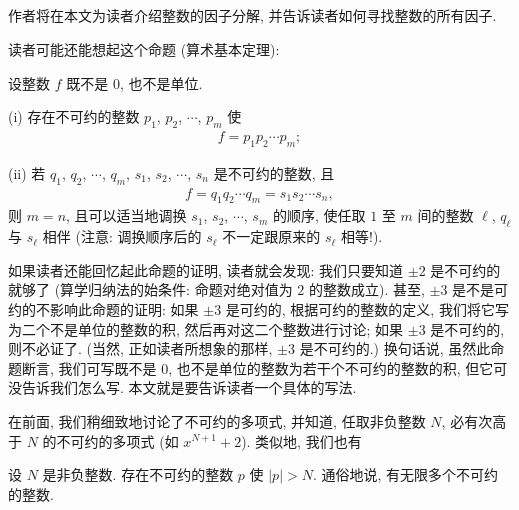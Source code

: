 \subsection*{\FactorizationOfIntegers}
\markright{\FactorizationOfIntegers}

作者将在本文为读者介绍整数的因子分解, 并告诉读者如何寻找整数的所有因子.

读者可能还能想起这个命题 (算术基本定理):
\begin{proposition}
    设整数 $f$ 既不是 $0$, 也不是单位.

    (i) 存在不可约的整数 $p_1$, $p_2$, $\cdots$, $p_m$ 使
    \begin{align*}
        f = p_1 p_2 \cdots p_m;
    \end{align*}

    (ii) 若 $q_1$, $q_2$, $\cdots$, $q_m$, $s_1$, $s_2$, $\cdots$, $s_n$ 是不可约的整数, 且
    \begin{align*}
        f = q_1 q_2 \cdots q_m = s_1 s_2 \cdots s_n,
    \end{align*}
    则 $m = n$, 且可以适当地调换 $s_1$, $s_2$, $\cdots$, $s_m$ 的顺序, 使任取 $1$ 至 $m$ 间的整数 $\ell$, $q_\ell$ 与 $s_\ell$ 相伴 (注意: 调换顺序后的 $s_\ell$ 不一定跟原来的 $s_\ell$ 相等!).
\end{proposition}

如果读者还能回忆起此命题的证明, 读者就会发现: 我们只要知道 $\pm 2$ 是不可约的就够了 (算学归纳法的始条件: 命题对绝对值为 $2$ 的整数成立). 甚至, $\pm 3$ 是不是可约的不影响此命题的证明: 如果 $\pm 3$ 是可约的, 根据可约的整数的定义, 我们将它写为二个不是单位的整数的积, 然后再对这二个整数进行讨论; 如果 $\pm 3$ 是不可约的, 则不必证了. (当然, 正如读者所想象的那样, $\pm 3$ 是不可约的.) 换句话说, 虽然此命题断言, 我们可写既不是 $0$, 也不是单位的整数为若干个不可约的整数的积, 但它可没告诉我们怎么写. 本文就是要告诉读者一个具体的写法.

在前面, 我们稍细致地讨论了不可约的多项式, 并知道, 任取非负整数 $N$, 必有次高于 $N$ 的不可约的多项式 (如 $x^{N+1} + 2$). 类似地, 我们也有
\begin{proposition}
    设 $N$ 是非负整数. 存在不可约的整数 $p$ 使 $|p| > N$. 通俗地说, 有无限多个不可约的整数.
\end{proposition}

